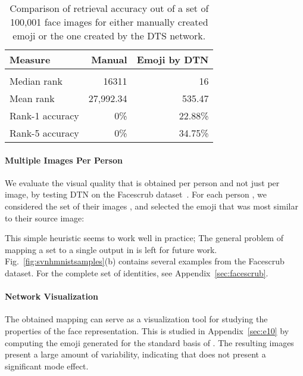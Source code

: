 \documentclass{article} \usepackage{iclr2017_conference,times}
\begin{document}
\begin{table}[t]
\caption{Comparison of retrieval accuracy out of a set of 100,001 face images for either manually created emoji or the one created by the DTS network.}
\label{tab:BvsG}
\begin{center}
\begin{tabular}{lrr}
Measure & Manual & Emoji by DTN\\ \hline \\
Median rank & 16311 & 16\\
Mean rank & 27,992.34 & 535.47\\
Rank-1 accuracy & 0\% & 22.88\% \\
Rank-5 accuracy & 0\% & 34.75\% \\
\hline
\end{tabular}
\end{center}
\end{table}

\paragraph{Multiple Images Per Person} We evaluate the visual quality that is obtained per person and not just per image, by testing DTN on the Facescrub dataset~\citep{facescrub}. For each person , we considered the set of their images , and  selected the emoji that was most similar to their source image:


This simple heuristic seems to work well in practice; The general problem of mapping a set  to a single output in  is left for future work.  Fig.~\ref{fig:svnhmnistsamples}(b) contains several examples from the Facescrub dataset. For the complete set of identities, see Appendix~\ref{sec:facescrub}.

\paragraph{Network Visualization} The obtained mapping  can serve as a visualization tool for studying the properties of the face representation. This is studied in Appendix~\ref{sec:e10} by computing the emoji generated for the standard basis of . The resulting images present a large amount of variability, indicating that  does not present a significant mode effect.
\end{document}
